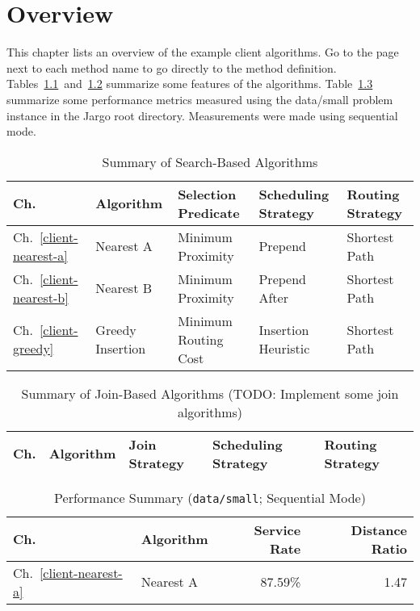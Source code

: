 \chapter{Overview}
\label{client-overview}

This chapter lists an overview of the example client algorithms. Go to the page
next to each method name to go directly to the method definition.
Tables~\ref{tab:search-algorithms}~and~\ref{tab:join-algorithms} summarize some
features of the algorithms. Table~\ref{tab:performance-summary} summarize some
performance metrics measured using the {\Tt{}data/small\nwendquote} problem instance in the
Jargo root directory. Measurements were made using sequential mode.

\begin{table}[h]
\begin{center}
\caption{Summary of Search-Based Algorithms}
\label{tab:search-algorithms}
\begin{tabular}{|l|l|l|l|l|}
\hline
Ch. & Algorithm & Selection Predicate & Scheduling Strategy & Routing Strategy \\
\hline
Ch.~\ref{client-nearest-a} & Nearest A & Minimum Proximity & Prepend & Shortest Path \\
Ch.~\ref{client-nearest-b} & Nearest B & Minimum Proximity & Prepend After& Shortest Path \\
Ch.~\ref{client-greedy} & Greedy Insertion & Minimum Routing Cost & Insertion Heuristic & Shortest Path \\
\hline
\end{tabular}
\end{center}
\end{table}

\begin{table}[h]
\begin{center}
\caption{Summary of Join-Based Algorithms (TODO: Implement some join algorithms)}
\label{tab:join-algorithms}
\begin{tabular}{|l|l|l|l|l|}
\hline
Ch. & Algorithm & Join Strategy & Scheduling Strategy & Routing Strategy \\
\hline
\end{tabular}
\end{center}
\end{table}

\begin{table}[h]
\begin{center}
\caption{Performance Summary (\texttt{data/small}; Sequential Mode)}
\label{tab:performance-summary}
\begin{tabular}{|l|l|r|r|}
\hline
Ch. & Algorithm & Service Rate & Distance Ratio \\
\hline
Ch.~\ref{client-nearest-a} & Nearest A & 87.59\% & 1.47 \\
\hline
\end{tabular}
\end{center}
\end{table}


